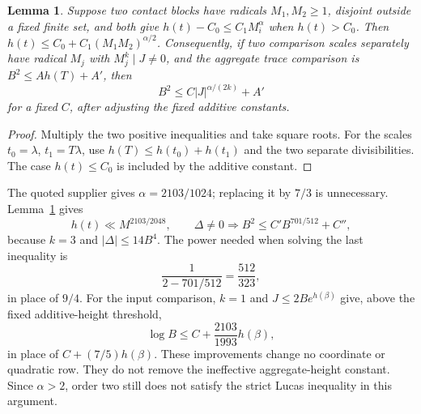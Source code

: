 \documentclass[11pt,a4paper]{article}
\newtheorem{lemma}[theorem]{Lemma}
\begin{document}
\begin{lemma}\label{lem:blocks}
Suppose two contact blocks have radicals $M_1,M_2\ge1$, disjoint outside
a fixed finite set, and both give
$h(t)-C_0\le C_1M_i^\alpha$ when $h(t)>C_0$.
Then $h(t)\le C_0+C_1(M_1M_2)^{\alpha/2}$.
Consequently, if two comparison scales separately have radical
$M_j$ with $M_j^k\mid J\ne0$, and the aggregate trace comparison is
$B^2\le A h(T)+A'$, then
\[
 B^2\le C|J|^{\alpha/(2k)}+A'
\]
for a fixed $C$, after adjusting the fixed additive constants.
\end{lemma}
\begin{proof}
Multiply the two positive inequalities and take square roots.
For the scales $t_0=\lambda$, $t_1=T\lambda$, use
$h(T)\le h(t_0)+h(t_1)$ and the two separate divisibilities.
The case $h(t)\le C_0$ is included by the additive constant.
\end{proof}
The quoted supplier gives $\alpha=2103/1024$; replacing it by $7/3$
is unnecessary. Lemma~\ref{lem:blocks} gives
\[
 h(t)\ll M^{2103/2048},\qquad
 \Delta\ne0\Longrightarrow B^2\le C'B^{701/512}+C'',
\]
because $k=3$ and $|\Delta|\le14B^4$.
The power needed when solving the last inequality is
\[
 \frac1{2-701/512}=\frac{512}{323},
\]
in place of $9/4$. For the input comparison, $k=1$ and
$J\le2B e^{h(\beta)}$ give, above the fixed additive-height threshold,
\[
 \log B\le C+\frac{2103}{1993}h(\beta),
\]
in place of $C+(7/5)h(\beta)$.
These improvements change no coordinate or quadratic row. They do not
remove the ineffective aggregate-height constant. Since $\alpha>2$,
order two still does not satisfy the strict Lucas inequality in this
argument.
\end{document}
